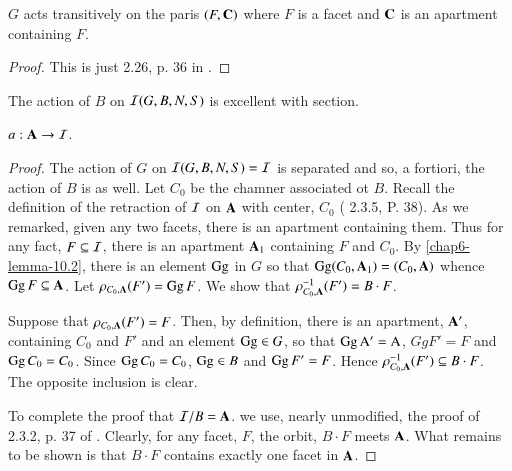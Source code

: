 \begin{seclem}\label{chap6-lemma-10.2}
$G$ acts transitively on the paris $(F, \mathbf{C})$ where $F$ is a facet and $\mathbf{C}$ is an apartment containing $F$. 
\end{seclem}

\begin{proof}
This is just 2.26, p. 36 in \cite{chap6-keyBT-I}.
\end{proof}

\begin{secprop}\label{chap6-proposition-10.3}
The action of $B$ on $\mathcal{I}(G, B, N, S)$ is excellent with section.

$a: \mathbf{A} \rightarrow \mathcal{I}$.
\end{secprop}

\begin{proof}
The action of $G$ on $\mathcal{I}(G, B, N, S)= \mathcal{I}$ is separated and so, a fortiori, the action of $B$ is as well. Let $C_{0}$ be the chamner associated ot $B$. Recall the definition of the retraction of $\mathcal{I}$ on $\mathbf{A}$ with center, $C_{0}$ (\cite{chap6-keyBT-I} 2.3.5, P. 38). As we remarked, given any two facets, there is an apartment containing them. Thus for any fact, $F\subseteq \mathcal{I}$, there is an apartment $\mathbf{A}_{1}$ containing $F$ and $C_{0}$. By \ref{chap6-lemma-10.2}, there is an element $\operatorname{Gg}$ in $G$ so that $\operatorname{Gg}(C_{0}, \mathbf{A}_{1}) = (C_{0}, \mathbf{A})$ whence $\operatorname{Gg} F\subseteq \mathbf{A}$.
Let $\rho_{C_{0},\mathbf{A}}(F') =\operatorname{Gg} F$. We show that $\rho_{C_{0},\mathbf{A}}^{-1}(F') =B \cdot F$.

Suppose that $\rho_{C_{0},\mathbf{A}}(F') = F$. Then, by definition, there is an apartment, $\mathbf{A}'$, containing $C_{0}$ and $F'$ and an element $\operatorname{Gg} \in G$, so that $\operatorname{Gg}\rm A' = \rm A$, $GgF' = F$ and $\operatorname{Gg} C_{0} = C_{0}$. Since $\operatorname{Gg} C_{0} =C_{0}$, $\operatorname{Gg} \in B$ and $\operatorname{Gg} F' = F$. Hence $\rho_{C_{0},\mathbf{A}}^{-1}(F') \subseteq B \cdot F$. The opposite inclusion is clear.

To complete the proof that $\mathcal{I}/B = \mathbf{A}$. we use, nearly unmodified, the proof of 2.3.2, p. 37 of \cite{chap6-keyBT-I}. Clearly, for any facet, $F$, the orbit, $B \cdot F$ meets $\mathbf{A}$. What remains to be shown is that $B \cdot F$ contains exactly one facet in $\mathbf{A}$.


\end{proof}
